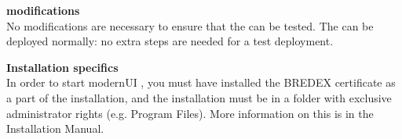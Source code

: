 \textbf{\gdaut{} modifications}\\
No modifications are necessary to ensure that the \gdaut{} can be tested. The \gdaut{} can be deployed normally: no extra steps are needed for a test deployment.

\textbf{Installation specifics}\\
In order to start modernUI \gdauts{}, you must have installed the BREDEX certificate as a part of the installation, and the installation must be in a folder with exclusive administrator rights (e.g. Program Files). More information on this is in the Installation Manual. 
